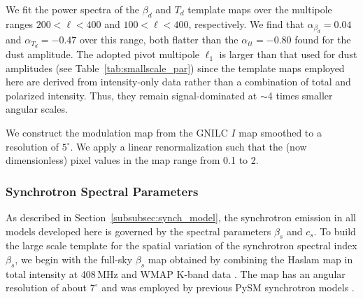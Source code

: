 \documentclass[twocolumn]{aastex631}
\newcommand{\giuse}[1]{\textcolor{orange}{(GP: #1)}}
\begin{document}
We fit the power spectra of the $\beta_d$ and $T_d$ template maps over the multipole ranges $200 < \ell < 400$ and $100 < \ell < 400$, respectively. We find that $\alpha_{\beta_d}= 0.04$ and $\alpha_{T_d} = -0.47$ over this range, both flatter than the $\alpha_{tt} = -0.80$ found for the dust amplitude. The adopted pivot multipole $\ell_1$ is larger than that used for dust amplitudes (see Table~\ref{tab:smallscale_par}) since the template maps employed here are derived from intensity-only data rather than a combination of total and polarized intensity. Thus, they remain signal-dominated at $\sim$4 times smaller angular scales.

We construct the modulation map from the GNILC $I$ map smoothed to a resolution of $5^\circ$. We apply a linear renormalization such that the (now dimensionless) pixel values in the map range from 0.1 to 2. %


 
\subsubsection{Synchrotron Spectral Parameters}\label{sec:beta_s}
As described in Section~\ref{subsubsec:synch_model}, the synchrotron emission in all models developed here is governed by the spectral parameters $\beta_s$ and $c_s$. To build the large scale template for the spatial variation of the synchrotron spectral index $\beta_s$, we begin with the full-sky $\beta_s$ map obtained by combining the Haslam map in total intensity at 408\,MHz \citep{Remazeilles:2015} and WMAP K-band data \citep{Miville-Deschenes:2008}. The map has an angular resolution of about $7^{\circ}$ and was employed by previous PySM synchrotron models \citep{Thorne:2017}.
\end{document}
